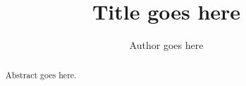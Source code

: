\documentclass{article}
\title{Title goes here}
\author{Author goes here}
\begin{document}
\maketitle

\begin{abstract}
Abstract goes here.
\end{abstract}
\end{document}
